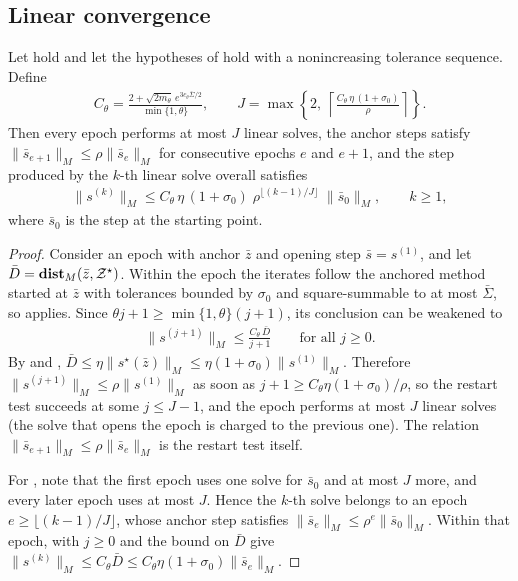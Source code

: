 \subsection{Linear convergence}
\begin{theorem}\label{thm:acc-restart}
    Let  hold and let the hypotheses of  hold with a nonincreasing tolerance sequence.
    Define
    \begin{align}
        C_\theta = \frac{2 + \sqrt{2m_\theta}\, e^{3c_\theta\bar\Sigma/2}}{\min\{1, \theta\}},
        \qquad
        J = \max\left\{2,\ \left\lceil \frac{C_\theta\, \eta\, (1 + \sigma_0)}{\rho}\right\rceil\right\}.
    \end{align}
    Then every epoch performs at most $J$ linear solves, the anchor steps satisfy $\|\bar s_{e+1}\|_M \le \rho\|\bar s_e\|_M$ for consecutive epochs $e$ and $e+1$, and the step produced by the $k$-th linear solve overall satisfies
    \begin{align}
        \|s^{(k)}\|_M \le C_\theta\,\eta\,(1 + \sigma_0)\; \rho^{\lfloor (k-1)/J \rfloor}\; \|\bar s_0\|_M, \qquad k \ge 1, \label{eq:acc-linear-rate}
    \end{align}
    where $\bar s_0$ is the step at the starting point.
\end{theorem}
\begin{proof}
    Consider an epoch with anchor $\bar z$ and opening step $\bar s = s^{(1)}$, and let $\bar D = \mathop{\bf dist{}}_M(\bar z, \mathcal{Z}^\star)$.
    Within the epoch the iterates follow the anchored method started at $\bar z$ with tolerances bounded by $\sigma_0$ and square-summable to at most $\bar\Sigma$, so  applies.
    Since $\theta j + 1 \ge \min\{1,\theta\}(j+1)$, its conclusion can be weakened to
    \begin{align}
        \|s^{(j+1)}\|_M \le \frac{C_\theta\,\bar D}{j+1} \qquad \text{for all } j \ge 0. \label{eq:acc-epoch-bound}
    \end{align}
    By  and , $\bar D \le \eta\|s^\star(\bar z)\|_M \le \eta(1+\sigma_0)\|s^{(1)}\|_M$.
    Therefore $\|s^{(j+1)}\|_M \le \rho\|s^{(1)}\|_M$ as soon as $j + 1 \ge C_\theta\eta(1+\sigma_0)/\rho$, so the restart test succeeds at some $j \le J - 1$, and the epoch performs at most $J$ linear solves (the solve that opens the epoch is charged to the previous one).
    The relation $\|\bar s_{e+1}\|_M \le \rho\|\bar s_e\|_M$ is the restart test itself.

    For , note that the first epoch uses one solve for $\bar s_0$ and at most $J$ more, and every later epoch uses at most $J$.
    Hence the $k$-th solve belongs to an epoch $e \ge \lfloor (k-1)/J\rfloor$, whose anchor step satisfies $\|\bar s_e\|_M \le \rho^{e}\|\bar s_0\|_M$.
    Within that epoch,  with $j \ge 0$ and the bound on $\bar D$ give $\|s^{(k)}\|_M \le C_\theta\bar D \le C_\theta\eta(1+\sigma_0)\|\bar s_e\|_M$.
\end{proof}

